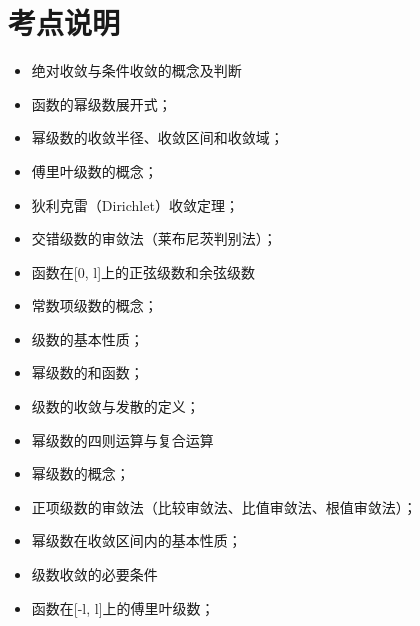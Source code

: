 \section{考点说明}
\begin{itemize}
\item 绝对收敛与条件收敛的概念及判断
\item 函数的幂级数展开式；
\item 幂级数的收敛半径、收敛区间和收敛域；
\item 傅里叶级数的概念；
\item 狄利克雷（Dirichlet）收敛定理；
\item 交错级数的审敛法（莱布尼茨判别法）；
\item 函数在[0, l]上的正弦级数和余弦级数
\item 常数项级数的概念；
\item 级数的基本性质；
\item 幂级数的和函数；
\item 级数的收敛与发散的定义；
\item 幂级数的四则运算与复合运算
\item 幂级数的概念；
\item 正项级数的审敛法（比较审敛法、比值审敛法、根值审敛法）；
\item 幂级数在收敛区间内的基本性质；
\item 级数收敛的必要条件
\item 函数在[-l, l]上的傅里叶级数；
\end{itemize}

